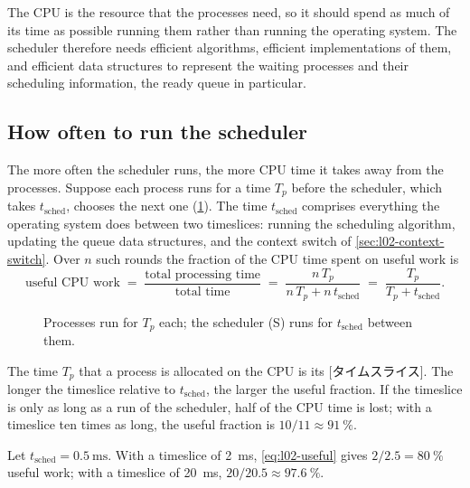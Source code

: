 \documentclass[../main.tex]{subfiles}
\begin{document}
The CPU is the resource that the processes need, so it should spend as much
of its time as possible running them rather than running the operating
system.  The scheduler therefore needs efficient algorithms, efficient
implementations of them, and efficient data structures to represent the
waiting processes and their scheduling information, the ready queue in
particular.


\subsection{How often to run the scheduler}

The more often the scheduler runs, the more CPU time it takes away from the
processes.  Suppose each
process runs for a time $T_p$ before the scheduler, which takes
$t_{\mathrm{sched}}$, chooses the next one (\cref{fig:l02-timeslice}).
The time $t_{\mathrm{sched}}$ comprises everything the operating system does
between two timeslices: running the scheduling algorithm, updating the
queue data structures, and the context switch of
\cref{sec:l02-context-switch}.  Over
$n$ such rounds the fraction of the CPU time spent on useful work is
\begin{equation}
  \text{useful CPU work}
  \;=\; \frac{\text{total processing time}}{\text{total time}}
  \;=\; \frac{n\,T_p}{n\,T_p + n\,t_{\mathrm{sched}}}
  \;=\; \frac{T_p}{T_p + t_{\mathrm{sched}}} .
  \label{eq:l02-useful}
\end{equation}

\begin{figure}[htbp]
  \centering
  
  \caption{Processes run for $T_p$ each; the scheduler (S) runs for
    $t_{\mathrm{sched}}$ between them.}
  \label{fig:l02-timeslice}
\end{figure}

The time $T_p$ that a process is allocated on the CPU is its
[タイムスライス].  The longer the timeslice relative to
$t_{\mathrm{sched}}$, the larger the useful fraction.  If the timeslice is
only as long as a run of the scheduler, half of the CPU time is lost; with a
timeslice ten times as long, the useful fraction is $10/11 \approx
\SI{91}{\percent}$.

\begin{example}
  Let $t_{\mathrm{sched}} = \SI{0.5}{\milli\second}$.  With a timeslice of
  \SI{2}{\milli\second}, \cref{eq:l02-useful} gives $2/2.5 =
  \SI{80}{\percent}$ useful work; with a timeslice of
  \SI{20}{\milli\second}, $20/20.5 \approx \SI{97.6}{\percent}$.
\end{example}
\end{document}
